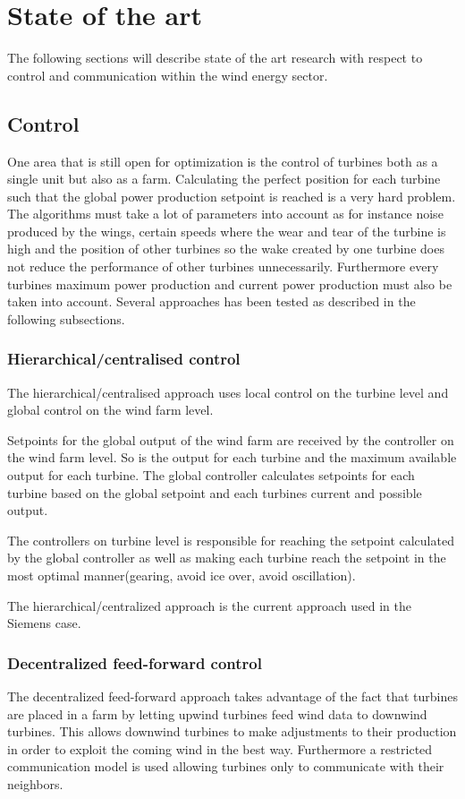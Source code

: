 \chapter{State of the art}
The following sections will describe state of the art research with respect to control and communication within the wind energy sector.

\section{Control}
One area that is still open for optimization is the control of turbines both as a single unit but also as a farm. 
Calculating the perfect position for each turbine such that the global power production setpoint is reached is a very hard problem.
The algorithms must take a lot of parameters into account as for instance noise produced by the wings, certain speeds where the wear and tear of the turbine is high and the position of other turbines so the wake created by one turbine does not reduce the performance of other turbines unnecessarily.
Furthermore every turbines maximum power production and current power production must also be taken into account.
Several approaches has been tested as described in the following subsections. %

\subsection{Hierarchical/centralised control}
The hierarchical/centralised approach uses local control on the turbine level and global control on the wind farm level\cite{CentralisedPowerControlOfWindFarm, HeirarchicalWindFarmControl}.

Setpoints for the global output of the wind farm are received by the controller on the wind farm level.
So is the output for each turbine and the maximum available output for each turbine.
The global controller calculates setpoints for each turbine based on the global setpoint and each turbines current and possible output.

The controllers on turbine level is responsible for reaching the setpoint calculated by the global controller as well as making each turbine reach the setpoint in the most optimal manner(gearing, avoid ice over, avoid oscillation).

The hierarchical/centralized approach is the current approach used in the Siemens case.

\subsection{Decentralized feed-forward control}
The decentralized feed-forward approach\cite{DecentralisedFeedforwardControlOfWindFarms} takes advantage of the fact that turbines are placed in a farm by letting upwind turbines feed wind data to downwind turbines. 
This allows downwind turbines to make adjustments to their production in order to exploit the coming wind in the best way.
Furthermore a restricted communication model is used allowing turbines only to communicate with their neighbors.

